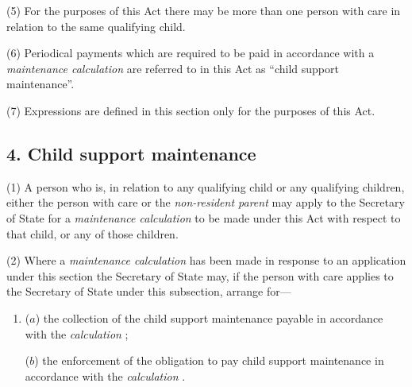 \documentclass[12pt,a4paper]{article}
\begin{document}
(5) For the purposes of this Act there may be more than one person with care in relation to the same qualifying child.

(6) Periodical payments which are required to be paid in accordance with a 
\emph{maintenance calculation}  %
are referred to in this Act as “child support maintenance”.

(7) Expressions are defined in this section only for the purposes of this Act.


\subsection{4. Child support maintenance}

(1) A person who is, in relation to any qualifying child or any qualifying children, either the person with care or the 
\emph{non-resident parent}  %
may apply to the 
Secretary of State  %
for a 
\emph{maintenance calculation}  %
to be made under this Act with respect to that child, or any of those children.

(2) Where a 
\emph{maintenance calculation}  %
has been made in response to an application under this section the 
Secretary of State  %
may, if the person with care 
applies to 
the Secretary of State  %
under this subsection, arrange for—
\begin{enumerate}\item[]
($a$) the collection of the child support maintenance payable in accordance with the 
\emph{calculation}%
;

($b$) the enforcement of the obligation to pay child support maintenance in accordance with the 
\emph{calculation}%
.
\end{enumerate}
\end{document}
